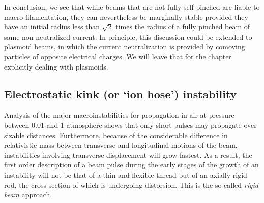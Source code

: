 \documentclass [12pt,a4paper,     ]{report} %
\begin{document}
   In conclusion, we see that while beams that are not fully self-pinched are liable to macro-filamentation, they can nevertheless be marginally stable provided they have an initial radius less than $\sqrt{2}$ times the radius of a fully pinched beam of same non-neutralized current.  In principle, this discussion could be extended to plasmoid beams, in which the current neutralization is provided by comoving particles of opposite electrical charges.  We will leave that for the chapter explicitly dealing with plasmoids.



\subsection{Electrostatic kink (or `ion hose') instability}


	Analysis of the major macroinstabilities for propagation in air at pressure between 0.01 and 1 atmosphere shows that only short pulses may propagate over sizable distances.  Furthermore, because of the considerable difference in relativistic mass between transverse and longitudinal motions of the beam, instabilities involving transverse displacement will grow fastest.  As a result, the first order description of a beam pulse during the early stages of the growth of an instability will not be that of a thin and flexible thread but of an axially rigid rod, the cross-section of which is undergoing  distorsion.  This is the so-called \emph{rigid beam} approach.
\end{document}
